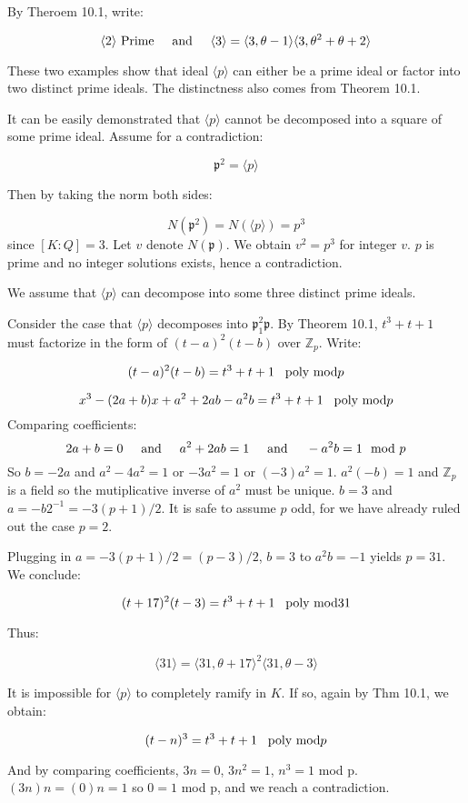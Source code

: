 \documentclass{article}
\def\ZZ{{\mathbb{Z}}}
\def\contradiction{{\lightning}}
\newcommand{\textAnd}{
    \hspace{5mm}
    \textrm{and}
    \hspace{5mm}
}
\newcommand{\polymod}{
    \hspace{3mm}
    \textrm{poly mod}
}
\newcommand{\<}{{{
    \langle
}}}
\def\>{{{
    \rangle
}}}
\def\ZZ{{\mathbb{Z}}}
\newcommand{\pideal}{
    {{\mathfrak{p}}}
}
\begin{document}
By Theroem 10.1, write:

\[
    \<2\> \textrm{   Prime}
    \textAnd 
    \<3\> = \<3, \theta - 1\>\<3, \theta^2 + \theta + 2\>
\]

These two examples show that ideal $\<p\>$
can either be a prime ideal or factor into two distinct prime ideals. 
The distinctness also comes from Theorem 10.1. 

It can be easily demonstrated that $\<p\>$ cannot be decomposed into a 
square of some prime ideal. Assume for a contradiction:

\[
    \pideal^2 = \<p\>
\]

Then by taking the norm both sides:

\[
    N(\pideal^2) = N(\<p\>) = p^3
\]
since $[K:Q] = 3$. Let $v$ denote $N(\pideal)$. We obtain $v^2 = p^3$ 
for integer $v$. $p$ is prime and no integer solutions exists, hence a 
contradiction. \contradiction

We assume that $\<p\>$ can decompose into some three distinct 
prime ideals. 

Consider the case that $\<p\>$ decomposes 
into $\pideal_1^2\pideal$. By Theorem 10.1, $t^3+t+1$ must factorize 
in the form of $(t-a)^2(t-b)$ over $\ZZ_p$. 
Write:

\[
    (t-a)^2(t-b) = t^3 +t+1 \polymod p
\]

\[
    x^3-(2a+b)x+a^2+2ab-a^2b = t^3 + t + 1 \polymod p 
\]
Comparing coefficients:
\[
    2a + b = 0 \textAnd a^2+2ab=1 \textAnd -a^2b = 1 \mod p
\]
So $b=-2a$ and $a^2 - 4a^2 = 1$ or $-3a^2 = 1$ or $(-3)a^2 = 1$. 
$a^2(-b) = 1$ and $\ZZ_p$ is a field so the mutiplicative inverse of 
$a^2$ must be unique. $b = 3$ and $a = -b2^{-1} = -3(p+1)/2$. It 
is safe to assume $p$ odd, for we have already ruled out the 
case $p = 2$. 

Plugging in $a = -3(p+1)/2 = (p-3)/2$, $b = 3$ to $a^2b = -1$ yields $p = 31$. 
We conclude:

\[
    (t+17)^2(t-3) = t^3+t+1 \polymod 31
\]

Thus:

\[
    \<31\> = \<31, \theta +17\>^2\<31, \theta -3\>
\]

It is impossible for $\<p\>$ to completely ramify in $K$. If so, again 
by Thm 10.1, we obtain:

\[
    (t-n)^3 = t^3+t+1 \polymod p 
\]

And by comparing coefficients, $3n = 0$, $3n^2=1$, $n^3 = 1$ mod p. 
$(3n)n = (0)n = 1$ so $0 = 1$ mod p, and we reach a contradiction. 
\end{document}
